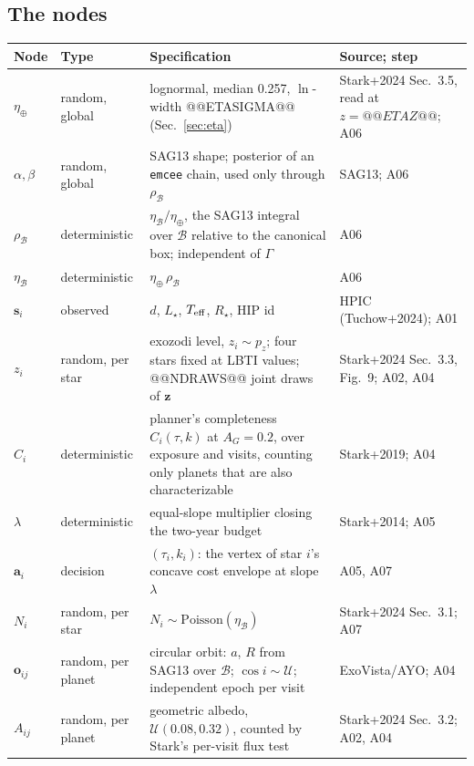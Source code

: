 \documentclass[11pt,a4paper]{article}
\begin{document}
\subsection{The nodes}

\begin{table}[htbp]
\centering
\scriptsize
\begin{tabular}{p{1.2cm}p{3.2cm}p{5.6cm}p{3.6cm}}
\toprule
\textbf{Node} & \textbf{Type} & \textbf{Specification} & \textbf{Source; step} \\
\midrule
$\eta_\oplus$ & random, global & lognormal, median 0.257, $\ln$-width @@ETASIGMA@@ (Sec.~\ref{sec:eta}) & Stark+2024 Sec.~3.5, read at $z=@@ETAZ@@$; A06 \\
$\alpha,\beta$ & random, global & SAG13 shape; posterior of an \texttt{emcee} chain, used only through $\rho_\mathcal{B}$ & SAG13; A06 \\
$\rho_\mathcal{B}$ & deterministic & $\eta_\mathcal{B}/\eta_\oplus$, the SAG13 integral over $\mathcal{B}$ relative to the canonical box; independent of $\Gamma$ & A06 \\
$\eta_\mathcal{B}$ & deterministic & $\eta_\oplus\,\rho_\mathcal{B}$ & A06 \\
$\mathbf{s}_i$ & observed & $d$, $L_\star$, $T_{\rm eff}$, $R_\star$, HIP id & HPIC (Tuchow+2024); A01 \\
$z_i$ & random, per star & exozodi level, $z_i \sim p_z$; four stars fixed at LBTI values; @@NDRAWS@@ joint draws of $\mathbf{z}$ & Stark+2024 Sec.~3.3, Fig.~9; A02, A04 \\
$C_i$ & deterministic & planner's completeness $C_i(\tau, k)$ at $A_G = 0.2$, over exposure and visits, counting only planets that are also characterizable & Stark+2019; A04 \\
$\lambda$ & deterministic & equal-slope multiplier closing the two-year budget & Stark+2014; A05 \\
$\mathbf{a}_i$ & decision & $(\tau_i, k_i)$: the vertex of star $i$'s concave cost envelope at slope $\lambda$ & A05, A07 \\
$N_i$ & random, per star & $N_i \sim \mathrm{Poisson}(\eta_\mathcal{B})$ & Stark+2024 Sec.~3.1; A07 \\
$\mathbf{o}_{ij}$ & random, per planet & circular orbit: $a$, $R$ from SAG13 over $\mathcal{B}$; $\cos i \sim \mathcal{U}$; independent epoch per visit & ExoVista/AYO; A04 \\
$A_{ij}$ & random, per planet & geometric albedo, $\mathcal{U}(0.08, 0.32)$, counted by Stark's per-visit flux test & Stark+2024 Sec.~3.2; A02, A04 \\

\end{tabular}
\end{table}
\end{document}
